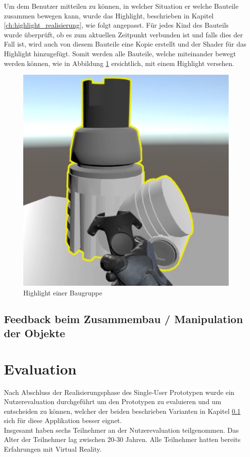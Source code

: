 \noindent Um dem Benutzer mitteilen zu können, in welcher Situation er welche Bauteile zusammen bewegen kann, wurde das Highlight, beschrieben in Kapitel \ref{ch:highlight_realisierung}, wie folgt angepasst. Für jedes Kind des Bauteils wurde überprüft, ob es zum aktuellen Zeitpunkt verbunden ist und falls dies der Fall ist, wird auch von diesem Bauteile eine Kopie erstellt und der Shader für das Highlight hinzugefügt. Somit werden alle Bauteile, welche miteinander bewegt werden können, wie in Abbildung \ref{fig:highlight_baugruppe} ersichtlich, mit einem Highlight versehen.

\begin{figure}[h!]
	\centering
	\includegraphics[keepaspectratio,width=0.4\linewidth]{img/Baugruppe_Highlight.PNG}
	\caption{Highlight einer Baugruppe}
	\label{fig:highlight_baugruppe}
\end{figure}

\subsection{Feedback beim Zusammembau / Manipulation der Objekte}
\label{ch:feedback_zusammenbau_manipulation}





\section{Evaluation}
Nach Abschluss der Realisierungsphase des Single-User Prototypen wurde ein Nutzerevaluation durchgeführt um den Prototypen zu evaluieren und um entscheiden zu können, welcher der beiden beschrieben Varianten in Kapitel \ref{ch:feedback_zusammenbau_manipulation} sich für diese Applikation besser eignet. \\

\noindent Insgesamt haben sechs Teilnehmer an der Nutzerevaluation teilgenommen. Das Alter der Teilnehmer lag zwischen 20-30 Jahren. Alle Teilnehmer hatten bereits Erfahrungen mit Virtual Reality. \\

